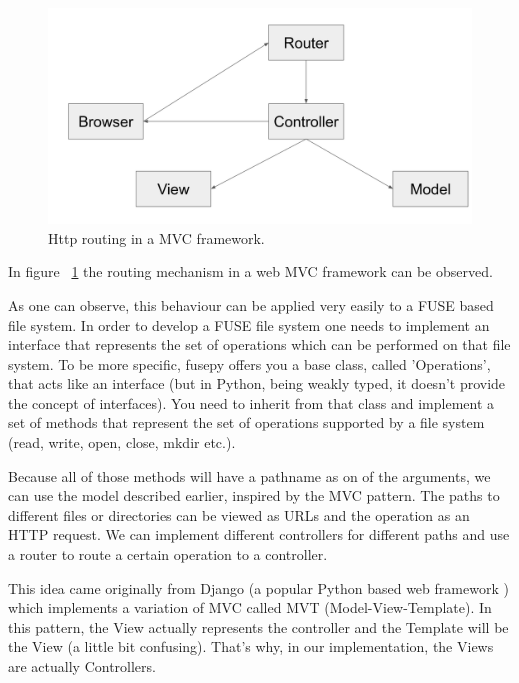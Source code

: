 \begin{figure}[h]
  \begin{center}
    \includegraphics[width=15cm]{layout/mvc.png}
    \caption{Http routing in a MVC framework.}
    \label{fig:mvc}
  \end{center}
\end{figure}

In figure ~\ref{fig:mvc} the routing mechanism in a web MVC framework can be observed.

As one can observe, this behaviour can be applied very easily to a FUSE based file system. In order to develop a FUSE file system one needs to implement an interface that represents the set of operations which can be performed on that file system. To be more specific, fusepy offers you a base class, called 'Operations', that acts like an interface (but in Python, being weakly typed, it doesn't provide the concept of interfaces). You need to inherit from that class and implement a set of methods that represent the set of operations supported by a file system (read, write, open, close, mkdir etc.).

Because all of those methods will have a pathname as on of the arguments, we can use the model described earlier, inspired by the MVC pattern. The paths to different files or directories can be viewed as URLs and the operation as an HTTP request. We can implement different controllers for different paths and use a router to route a certain operation to a controller.

This idea came originally from Django (a popular Python based web framework \cite{Django}) which implements a variation of MVC called MVT (Model-View-Template). In this pattern, the View actually represents the controller and the Template will be the View (a little bit confusing). That's why, in our implementation, the Views are actually Controllers.

